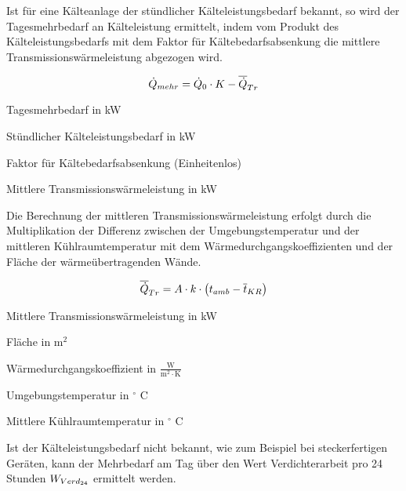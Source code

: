 Ist f\"ur eine K\"alteanlage der st\"undlicher K\"alteleistungsbedarf bekannt,
so wird der Tagesmehrbedarf an K\"alteleistung ermittelt, indem vom Produkt des
K\"alteleistungsbedarfs mit dem Faktor f\"ur K\"altebedarfsabsenkung die
mittlere Transmissionswärmeleistung abgezogen wird.

\begin{equation}
	\pmehr = \pkalt \cdot K - \aptrans
\label{pmehr}
\end{equation}

\begin{description}[\dth]

	\item[$\pmehr$] Tagesmehrbedarf in kW
	\item[$\pkalt$] St\"undlicher Kälteleistungsbedarf in kW
	\item[$K$] Faktor für Kältebedarfsabsenkung (Einheitenlos)
	\item[$\aptrans$] Mittlere Transmissionswärmeleistung in kW

\end{description}
\vspace{0.5cm}

Die Berechnung der mittleren Transmissionswärmeleistung erfolgt durch die
Multiplikation der Differenz zwischen der Umgebungstemperatur und der mittleren
Kühlraumtemperatur mit dem Wärmedurchgangskoeffizienten und der Fläche der
wärmeübertragenden Wände.

\begin{equation}
	\aptrans = A \cdot k \cdot \left( t_{amb} -
	\overline{t}_{KR} \right)
	\label{aptrans}
\end{equation}

\begin{description}[\dth]

	\item[$\aptrans$] Mittlere Transmissionswärmeleistung in kW
	\item[$A$] Fläche in $\mathrm{m^2}$
	\item[$k$] Wärmedurchgangskoeffizient in $\mathrm{\frac{W}{m^2 \cdot K}}$
	\item[$t_{amb}$] Umgebungstemperatur in $^{\circ}$ C
	\item[$\overline{t}_{KR}$] Mittlere Kühlraumtemperatur in
		$^{\circ}$ C
\end{description}
\vspace{0.5cm}

Ist der Kälteleistungsbedarf nicht bekannt, wie zum Beispiel bei steckerfertigen
Geräten, kann der Mehrbedarf am Tag \"uber den Wert Verdichterarbeit pro 24
Stunden ${W}_{Verd_{24}}$ ermittelt werden.

